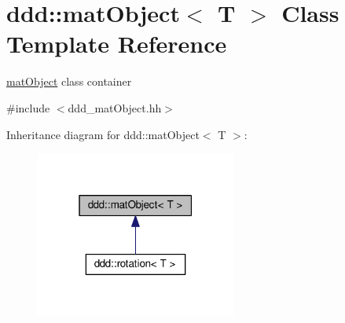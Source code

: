 \hypertarget{classddd_1_1mat_object}{}\section{ddd\+:\+:mat\+Object$<$ T $>$ Class Template Reference}
\label{classddd_1_1mat_object}


\hyperlink{classddd_1_1mat_object}{mat\+Object} class container  




{\ttfamily \#include $<$ddd\+\_\+mat\+Object.\+hh$>$}



Inheritance diagram for ddd\+:\+:mat\+Object$<$ T $>$\+:
\nopagebreak
\begin{figure}[H]
\begin{center}
\leavevmode
\includegraphics[width=187pt]{d3/d7e/classddd_1_1mat_object__inherit__graph}
\end{center}
\end{figure}
